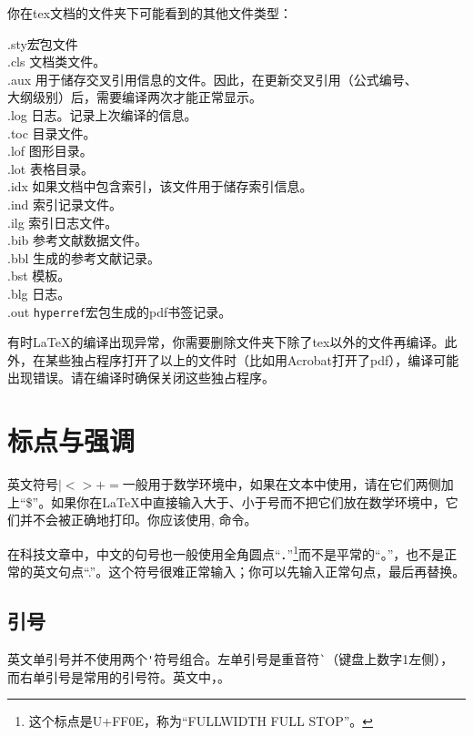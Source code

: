 你在tex文档的文件夹下可能看到的其他文件类型：
\begin{tabbing}
	.sty{\hspace{2em}}\=宏包文件\\
	.cls	\> 文档类文件。\\
	.aux    \> 用于储存交叉引用信息的文件。因此，在更新交叉引用（公式编号、\\
	\> 大纲级别）后，需要编译两次才能正常显示。\\
	.log    \> 日志。记录上次编译的信息。\\
	.toc    \> 目录文件。\\
	.lof    \> 图形目录。\\
	.lot    \> 表格目录。\\
	.idx    \> 如果文档中包含索引，该文件用于储存索引信息。\\
	.ind	\> 索引记录文件。\\
	.ilg	\> 索引日志文件。\\
	.bib	\> \bibtex 参考文献数据文件。\\
	.bbl	\> \bibtex 生成的参考文献记录。\\
	.bst	\> \bibtex 模板。\\
	.blg	\> \bibtex 日志。\\
	.out	\> \texttt{hyperref}宏包生成的pdf书签记录。
\end{tabbing}

有时\LaTeX 的编译出现异常，你需要删除文件夹下除了tex以外的文件再编译。此外，在某些独占程序打开了以上的文件时（比如用Acrobat打开了pdf），编译可能出现错误。请在编译时确保关闭这些独占程序。

\section{标点与强调}
英文符号$|<>+=$一般用于数学环境中，如果在文本中使用，请在它们两侧加上“\$”。如果你在\LaTeX 中直接输入大于、小于号而不把它们放在数学环境中，它们并不会被正确地打印。你应该使用, 命令。

在科技文章中，中文的句号也一般使用全角圆点“．”\footnote{这个标点是U+FF0E，称为“FULLWIDTH FULL STOP”。}而不是平常的“。”，也不是正常的英文句点“.”。这个符号很难正常输入；你可以先输入正常句点，最后再替换。

\subsection{引号}
英文单引号并不使用两个\verb|'|符号组合。左单引号是重音符\verb|`|（键盘上数字1左侧），而右单引号是常用的引号符。英文中，。

